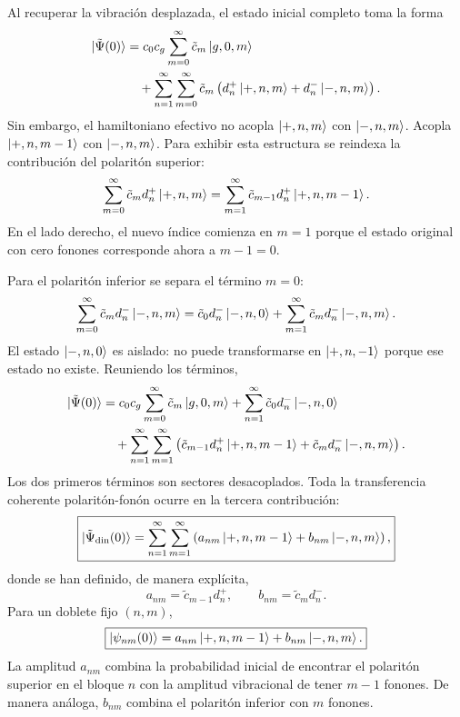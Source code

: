 \documentclass[11pt]{article}
\begin{document}
Al recuperar la vibraci\'on desplazada, el estado inicial completo toma la
forma
\begin{align}
  \ket{\tilde\Psi(0)}
  &=
  c_0c_g
  \sum_{m=0}^{\infty}
  \tilde c_m\ket{g,0,m}
  \notag\\
  &\quad+
  \sum_{n=1}^{\infty}\sum_{m=0}^{\infty}
  \tilde c_m
  \left(
  d_n^+\ket{+,n,m}
  +
  d_n^-\ket{-,n,m}
  \right).
\end{align}
Sin embargo, el hamiltoniano efectivo no acopla
$\ket{+,n,m}$ con $\ket{-,n,m}$. Acopla
$\ket{+,n,m-1}$ con $\ket{-,n,m}$. Para exhibir esta estructura se reindexa la
contribuci\'on del polarit\'on superior:
\begin{equation}
  \sum_{m=0}^{\infty}
  \tilde c_md_n^+\ket{+,n,m}
  =
  \sum_{m=1}^{\infty}
  \tilde c_{m-1}d_n^+\ket{+,n,m-1}.
\end{equation}
En el lado derecho, el nuevo \'indice comienza en $m=1$ porque el estado
original con cero fonones corresponde ahora a $m-1=0$.

Para el polarit\'on inferior se separa el t\'ermino $m=0$:
\begin{equation}
  \sum_{m=0}^{\infty}
  \tilde c_md_n^-\ket{-,n,m}
  =
  \tilde c_0d_n^-\ket{-,n,0}
  +
  \sum_{m=1}^{\infty}
  \tilde c_md_n^-\ket{-,n,m}.
\end{equation}
El estado $\ket{-,n,0}$ es aislado: no puede transformarse en
$\ket{+,n,-1}$ porque ese estado no existe. Reuniendo los t\'erminos,
\begin{align}
  \ket{\tilde\Psi(0)}
  &=
  c_0c_g
  \sum_{m=0}^{\infty}
  \tilde c_m\ket{g,0,m}
  +
  \sum_{n=1}^{\infty}
  \tilde c_0d_n^-\ket{-,n,0}
  \notag\\
  &\quad+
  \sum_{n=1}^{\infty}\sum_{m=1}^{\infty}
  \left(
  \tilde c_{m-1}d_n^+\ket{+,n,m-1}
  +
  \tilde c_md_n^-\ket{-,n,m}
  \right).
\end{align}
Los dos primeros t\'erminos son sectores desacoplados. Toda la transferencia
coherente polarit\'on-fon\'on ocurre en la tercera contribuci\'on:
\begin{equation}
  \boxed{
  \ket{\tilde\Psi_{\mathrm{din}}(0)}
  =
  \sum_{n=1}^{\infty}\sum_{m=1}^{\infty}
  \left(
  a_{nm}\ket{+,n,m-1}
  +
  b_{nm}\ket{-,n,m}
  \right),
  }
\end{equation}
donde se han definido, de manera expl\'icita,
\begin{equation}
  \boxed{
  a_{nm}
  =
  \tilde c_{m-1}d_n^+,
  \qquad
  b_{nm}
  =
  \tilde c_md_n^-.
  }
\end{equation}
Para un doblete fijo $(n,m)$,
\begin{equation}
  \boxed{
  \ket{\psi_{nm}(0)}
  =
  a_{nm}\ket{+,n,m-1}
  +
  b_{nm}\ket{-,n,m}.
  }
\end{equation}
La amplitud $a_{nm}$ combina la probabilidad inicial de encontrar el
polarit\'on superior en el bloque $n$ con la amplitud vibracional de tener
$m-1$ fonones. De manera an\'aloga, $b_{nm}$ combina el polarit\'on inferior
con $m$ fonones.
\end{document}
